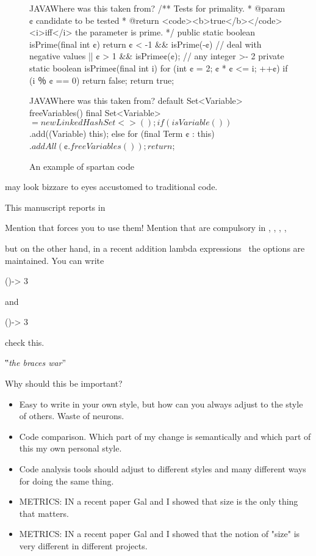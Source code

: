 \begin{figure}[h]
\begin{Code}{JAVA}{Where was this taken from?}
/** Tests for primality.
  * @param ¢ candidate to be tested
  * @return <code><b>true</b></code> <i>iff</i> the parameter is prime. */
public static boolean isPrime(final int ¢) {
  return ¢ < -1 && isPrime(-¢) // deal with negative values
      || ¢ > 1 && isPrime¢(¢); // any integer >- 2
}
private static boolean isPrime¢(final int i) {
  for (int ¢ = 2; ¢ * ¢ <= i; ++¢)
    if (i ％ ¢ == 0)
      return false;
  return true;
}
\end{Code}
\end{figure}

\begin{figure}[h]
  \begin{Code}{JAVA}{Where was this taken from?}
default Set<Variable> freeVariables() {
    final Set<Variable> $ = new LinkedHashSet<>();
    if (isVariable())
      $.add((Variable) this);
    else
      for (final Term ¢ : this)
        $.addAll(¢.freeVariables());
    return $;
  }
\end{Code}
\label{figure:shock-3}
\caption{An example of spartan code}
\end{figure}

may look bizzare to eyes accustomed to traditional \Java code.

This manuscript reports in

Mention that \Go forces you to use them!
Mention that are compulsory in ,
,
,
,

but on the other hand, in a recent addition lambda expressions~\cite{lambda}
the options are maintained.
You can write
\begin{JAVA}
()-> 3
\end{JAVA}
and
\begin{JAVA}
  ()-> {3}
\end{JAVA}
check this.

‟\emph{the braces war}”

Why should this be important?
\begin{itemize}
    \item Easy to write in your own style, but how can
      you always adjust to the style of others.
      Waste of neurons.
    \item Code comparison. Which part of my change is semantically and which
      part of this my own personal style.
    \item Code analysis tools should adjust to different styles and many
        different ways for doing the same thing.
    \item METRICS: IN a recent paper Gal and I showed that size
      is the only thing that matters.
    \item METRICS: IN a recent paper Gal and I showed that the notion of
      "size" is very different in different projects.
\end{itemize}

